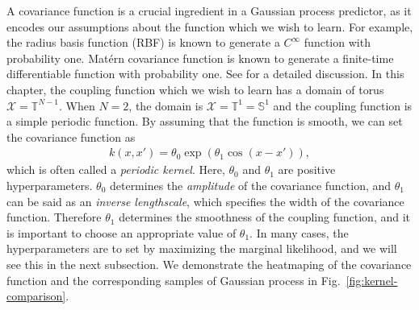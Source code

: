 A covariance function is a crucial ingredient in a Gaussian process predictor, as it encodes our assumptions about the function which we wish to learn.
For example, the radius basis function (RBF) is known to generate a $C^{\infty}$ function with probability one.
Matérn covariance function is known to generate a finite-time differentiable function with probability one.
See \cite{kanagawa2018} for a detailed discussion.
In this chapter, the coupling function which we wish to learn has a domain of torus $\mathcal{X}=\mathbb{T}^{N-1}$.
When $N=2$, the domain is $\mathcal{X}=\mathbb{T}^{1}=\mathbb{S}^{1}$ and the coupling function is a simple periodic function.
By assuming that the function is smooth, we can set the covariance function as 
\begin{align}
    k(x,x')=\theta_{0}\exp(\theta_{1}\cos(x-x')),
    \label{eq:kernel-1d}
\end{align}
which is often called a \textit{periodic kernel}.
Here, $\theta_{0}$ and $\theta_{1}$ are positive hyperparameters.
$\theta_{0}$ determines the \textit{amplitude} of the covariance function,
and $\theta_{1}$ can be said as an \textit{inverse lengthscale},
which specifies the width of the covariance function.
Therefore $\theta_{1}$ determines the smoothness of the coupling function,
and it is important to choose an appropriate value of $\theta_{1}$.
In many cases, the hyperparameters are to set by maximizing the marginal likelihood,
and we will see this in the next subsection.
We demonstrate the heatmaping of the covariance function and the corresponding samples of Gaussian process in Fig.~\ref{fig:kernel-comparison}.

